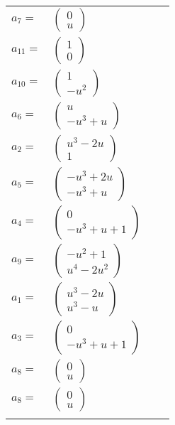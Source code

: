 \documentclass[1p]{elsarticle_modified}
\theoremstyle{definition}
\begin{document}
\begin{tabular}{m{7pt} m{180pt} m{7pt} m{180pt} }
\flushright $a_{7}=$&$\begin{pmatrix}0\\u\end{pmatrix}$ \\
\flushright $a_{11}=$&$\begin{pmatrix}1\\0\end{pmatrix}$ \\
\flushright $a_{10}=$&$\begin{pmatrix}1\\- u^2\end{pmatrix}$ \\
\flushright $a_{6}=$&$\begin{pmatrix}u\\- u^3+u\end{pmatrix}$ \\
\flushright $a_{2}=$&$\begin{pmatrix}u^3-2 u\\1\end{pmatrix}$ \\
\flushright $a_{5}=$&$\begin{pmatrix}- u^3+2 u\\- u^3+u\end{pmatrix}$ \\
\flushright $a_{4}=$&$\begin{pmatrix}0\\- u^3+u+1\end{pmatrix}$ \\
\flushright $a_{9}=$&$\begin{pmatrix}- u^2+1\\u^4-2 u^2\end{pmatrix}$ \\
\flushright $a_{1}=$&$\begin{pmatrix}u^3-2 u\\u^3- u\end{pmatrix}$ \\
\flushright $a_{3}=$&$\begin{pmatrix}0\\- u^3+u+1\end{pmatrix}$ \\
\flushright $a_{8}=$&$\begin{pmatrix}0\\u\end{pmatrix}$\\ \flushright $a_{8}=$&$\begin{pmatrix}0\\u\end{pmatrix}$\\&\end{tabular}
\end{document}
